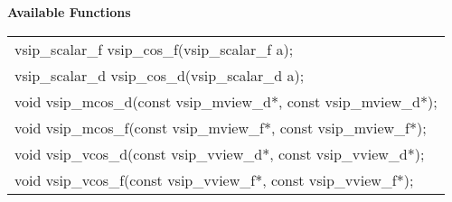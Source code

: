 \\\cvsiplh
\\ \hspace*{.8cm} \vspace*{.1cm} \textbf{Available Functions }
\\ \hspace*{1.1cm} {
\ttfamily
\begin{tabular}[H]{l}
vsip\_scalar\_f vsip\_cos\_f(vsip\_scalar\_f a);\\
vsip\_scalar\_d vsip\_cos\_d(vsip\_scalar\_d a);\\
void vsip\_mcos\_d(const vsip\_mview\_d*, const vsip\_mview\_d*);\\
void vsip\_mcos\_f(const vsip\_mview\_f*, const vsip\_mview\_f*);\\
void vsip\_vcos\_d(const vsip\_vview\_d*, const vsip\_vview\_d*);\\
void vsip\_vcos\_f(const vsip\_vview\_f*, const vsip\_vview\_f*);\\
\end{tabular}
}
\\\pyjvsiph
{}
